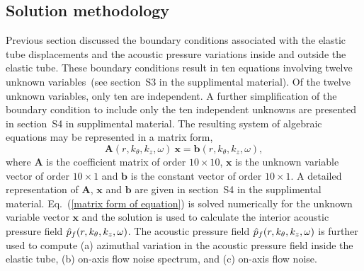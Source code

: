 \documentclass[11pt,cleanfoot]{asme2ej}
\begin{document}

\subsection{Solution methodology}\label{solution methods}
Previous section discussed the boundary conditions associated with the elastic tube displacements and the acoustic pressure variations inside and outside the elastic tube. These boundary conditions result in ten equations involving twelve unknown variables~(see section~S3 in the supplimental material). Of the twelve unknown variables, only ten are independent. A further simplification of the boundary condition to include only the ten independent unknowns are presented in section~S4 in supplimental material. The resulting system of algebraic equations may be represented in a matrix form,
\begin{equation}\label{matrix form of equation}
    \mathbf{A}(r,k_\theta,k_z,\omega)~\mathbf{x} = \mathbf{b}(r,k_\theta,k_z,\omega),   
\end{equation}
where $\mathbf{A}$ is the coefficient matrix of order $10\times10$, $\mathbf{x}$ is the unknown variable vector of order $10\times1$ and $\mathbf{b}$ is the constant vector of order $10\times1$. A detailed representation of $\mathbf{A}$, $\mathbf{x}$ and $\mathbf{b}$ are given in section~S4 in the supplimental material. Eq.~(\ref{matrix form of equation}) is solved numerically for the unknown variable vector $\mathbf{x}$ and the solution is used to calculate the interior acoustic pressure field $\Hat{p}_f(r,k_\theta,k_z,\omega)$. The acoustic pressure field $\Hat{p}_f(r,k_\theta,k_z,\omega)$ is further used to compute (a) azimuthal variation in the acoustic pressure field inside the elastic tube, (b) on-axis flow noise spectrum, and (c) on-axis flow noise.
\end{document}
